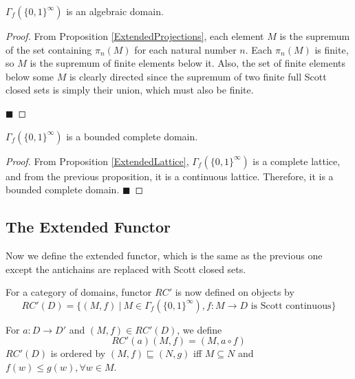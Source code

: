 \begin{proposition}
$\Gamma_{f}(\{0,1\}^\infty)$ is an algebraic domain.
\end{proposition}
\begin{proof}
From Proposition \ref{ExtendedProjections}, each element $M$ is the supremum of the set containing $\pi_n(M)$ for each natural number $n$.  Each $\pi_n(M)$ is finite, so $M$ is the supremum of finite elements below it.  Also, the set of finite elements below some $M$ is clearly directed since the supremum of two finite full Scott closed sets is simply their union, which must also be finite.
 
 \hfill $\blacksquare$
\end{proof}

\begin{corollary}
$\Gamma_{f}(\{0,1\}^\infty)$ is a bounded complete domain.
\end{corollary}
\begin{proof}
From Proposition \ref{ExtendedLattice}, $\Gamma_{f}(\{0,1\}^\infty)$ is a complete lattice, and from the previous proposition, it is a continuous lattice.  Therefore, it is a bounded complete domain.
\hfill $\blacksquare$
\end{proof}

\subsection{The Extended Functor}

Now we define the extended functor, which is the same as the previous one except the antichains are replaced with Scott closed sets.
\begin{definition}
For a category of domains, functor $RC'$ is now defined on objects by  \[RC'(D) = \{(M,f)\ |\ M\in \Gamma_{f}(\{0,1\}^\infty), f:M\rightarrow D \textrm{ is Scott continuous} \}\]
\end{definition}
For $a:D\rightarrow D'$ and $(M,f) \in RC'(D)$, we define \[RC'(a)(M,f) = (M,a\circ f)\]
$RC'(D)$ is ordered by $(M,f)\sqsubseteq (N,g)$ iff $M\subseteq N$ and $f(w) \leq g(w), \forall w\in M$.

